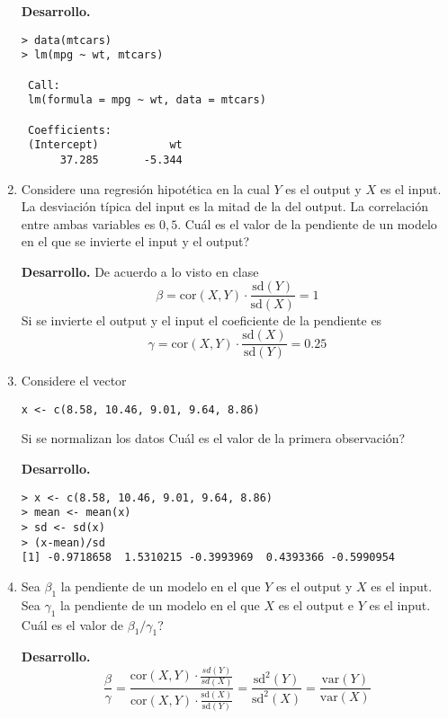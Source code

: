 \documentclass[11pt,oneside,spanish]{article}
\theoremstyle{definition}
\theoremstyle{definition}\newtheorem{definicion}{Definicin}
\theoremstyle{definition}\newtheorem{ejemplo}{Ejemplo}
\theoremstyle{remark}\newtheorem{nota}{\textsc{Nota}}
\theoremstyle{definition}\newtheorem{proposicion}{Proposicin}
\theoremstyle{definition}\newtheorem{problema}{Problema}
\begin{document}
\begin{enumerate}[(1)]
\textbf{Desarrollo.}
\begin{lstlisting}[backgroundcolor=\color{Gray!20},frame=none,basicstyle=\ttfamily]
> data(mtcars)
> lm(mpg ~ wt, mtcars)

 Call:
 lm(formula = mpg ~ wt, data = mtcars)

 Coefficients:
 (Intercept)           wt  
      37.285       -5.344  
\end{lstlisting}

\item Considere una regresi\'on hipot\'etica en la cual $Y$ es el output y $X$ es el input. La desviaci\'on t\'ipica del input es la mitad de la del output. La correlaci\'on entre ambas variables es $0,5$. {\textquestiondown}Cu\'al es el valor de la pendiente de un modelo en el que se invierte el input y el output?

\textbf{Desarrollo.}
De acuerdo a lo visto en clase 
$$\beta = \text{cor}(X,Y) \cdot \frac{\text{sd}(Y)}{\text{sd}(X)} =  1$$
Si se invierte el output y el input el coeficiente de la pendiente es
$$\gamma = \text{cor}(X,Y) \cdot \frac{\text{sd}(X)}{\text{sd}(Y)} = 0.25$$

\item Considere el vector 
\begin{lstlisting}[backgroundcolor=\color{Gray!20},frame=none,basicstyle=\ttfamily]
 x <- c(8.58, 10.46, 9.01, 9.64, 8.86)
\end{lstlisting}
Si se normalizan los datos {\textquestiondown}Cu\'al es el valor de la primera observaci\'on?	

\textbf{Desarrollo.}
\begin{lstlisting}[backgroundcolor=\color{Gray!20},frame=none,basicstyle=\ttfamily]
> x <- c(8.58, 10.46, 9.01, 9.64, 8.86)
> mean <- mean(x)
> sd <- sd(x)
> (x-mean)/sd
[1] -0.9718658  1.5310215 -0.3993969  0.4393366 -0.5990954
\end{lstlisting}

\item Sea $\beta_1$ la pendiente de un modelo en el que $Y$ es el output y $X$ es el input. Sea $\gamma_1$ la pendiente de un modelo en el que $X$ es el output e $Y$ es el input. {\textquestiondown}Cu\'al es el valor de $\beta_1 / \gamma_1$?		

\textbf{Desarrollo.}
$$\displaystyle \frac{\beta}{\gamma} = \displaystyle\frac{\text{cor}(X,Y)\cdot \displaystyle \frac{sd(Y)}{sd(X)}}{\text{cor}(X,Y)\cdot \displaystyle \frac{\text{sd}(X)}{\text{sd}(Y)}} = \displaystyle \frac{\text{sd}^2(Y)}{\text{sd}^2(X)} = \displaystyle \frac{\text{var}(Y)}{\text{var}(X)}$$


\end{enumerate}
\end{document}

